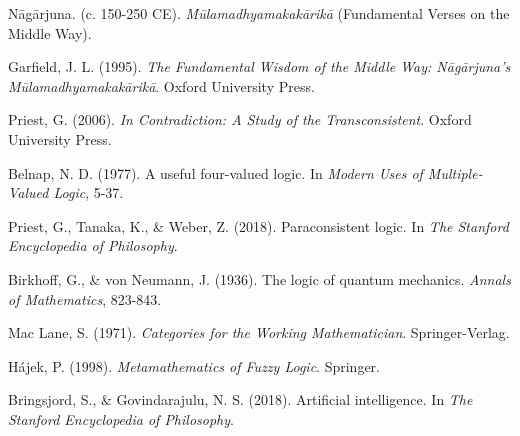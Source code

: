 \documentclass[11pt,a4paper]{article}
\begin{document}

\begin{thebibliography}{9}

Nāgārjuna. (c. 150-250 CE). \textit{Mūlamadhyamakakārikā} (Fundamental Verses on the Middle Way).

Garfield, J. L. (1995). \textit{The Fundamental Wisdom of the Middle Way: Nāgārjuna's Mūlamadhyamakakārikā}. Oxford University Press.

Priest, G. (2006). \textit{In Contradiction: A Study of the Transconsistent}. Oxford University Press.

Belnap, N. D. (1977). A useful four-valued logic. In \textit{Modern Uses of Multiple-Valued Logic}, 5-37.

Priest, G., Tanaka, K., \& Weber, Z. (2018). Paraconsistent logic. In \textit{The Stanford Encyclopedia of Philosophy}.

Birkhoff, G., \& von Neumann, J. (1936). The logic of quantum mechanics. \textit{Annals of Mathematics}, 823-843.

Mac Lane, S. (1971). \textit{Categories for the Working Mathematician}. Springer-Verlag.

Hájek, P. (1998). \textit{Metamathematics of Fuzzy Logic}. Springer.

Bringsjord, S., \& Govindarajulu, N. S. (2018). Artificial intelligence. In \textit{The Stanford Encyclopedia of Philosophy}.

\end{thebibliography}
\end{document}
